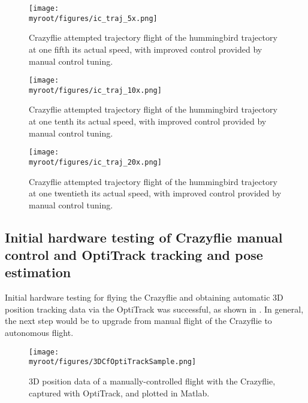 \documentclass[onecolumn,10pt]{IEEEtran}
\newcommand{\myroot}{../}
\newcommand{\MATLAB}{Matlab}
\begin{document}
\begin{figure}[p]
\begin{center}
\texttt{[image: \\myroot/figures/ic\_traj\_5x.png]}
\end{center}
\caption{Crazyflie attempted trajectory flight of the hummingbird trajectory at one fifth its actual speed, with improved control provided by manual control tuning.}
\label{fig:iconefifthspeed}
\end{figure}

\begin{figure}[p]
\begin{center}
\texttt{[image: \\myroot/figures/ic\_traj\_10x.png]}
\end{center}
\caption{Crazyflie attempted trajectory flight of the hummingbird trajectory at one tenth its actual speed, with improved control provided by manual control tuning.}
\label{fig:iconetenthspeed}
\end{figure}

\begin{figure}[p]
\begin{center}
\texttt{[image: \\myroot/figures/ic\_traj\_20x.png]}
\end{center}
\caption{Crazyflie attempted trajectory flight of the hummingbird trajectory at one twentieth its actual speed, with improved control provided by manual control tuning.}
\label{fig:iconetwentiethspeed}
\end{figure}


\subsection{Initial hardware testing of Crazyflie manual control and OptiTrack tracking and pose estimation}
Initial hardware testing for flying the Crazyflie and obtaining automatic 3D position tracking data via the OptiTrack was successful, as shown in . In general, the next step would be to upgrade from manual flight of the Crazyflie to autonomous flight.
\begin{figure}
\begin{center}
\texttt{[image: \\myroot/figures/3DCfOptiTrackSample.png]}
\end{center}
\caption{3D  position data  of a manually-controlled flight with the Crazyflie, captured with OptiTrack, and plotted in \MATLAB.}
\label{fig:manualFlight}
\end{figure}
	
\end{document}
